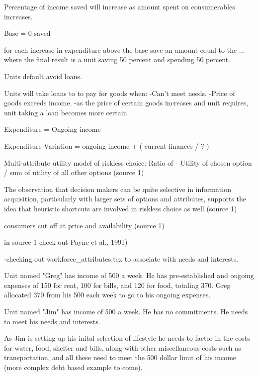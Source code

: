Percentage of income saved will increase as amount spent on consumerables increases.


Base = 0 saved

for each increase in expenditure above the base save an amount equal to the ... where the final result is a unit saving 50 percent and spending 50 percent.



Units default avoid loans.

Units will take loans to to pay for goods when:
-Can't meet needs.
-Price of goods exceeds income.
	-as the price of certain goods increases and unit requires, unit taking a loan becomes more certain. 





 

Expenditure = Ongoing income 

Expenditure Variation = ongoing income + ( current finances / ? )

Multi-attribute utility model of riskless choice:
Ratio of - Utility of chosen option / sum of utility of all other options (source 1)

The observation that decision makers can be quite selective in information acquisition, particularly with larger sets of options and attributes, supports the idea that heuristic shortcuts are involved in riskless choice as well (source 1)

consumers cut off at price and availability (source 1)

in source 1 check out Payne et al., 1991)


-checking out workforce_attributes.tex to associate with needs and interests.







Unit named "Greg" has income of 500 a week. He has pre-established and ongoing expenses of 150 for rent, 100 for bills, and 120 for food, totaling 370. Greg allocated 370 from his 500 each week to go to his ongoing expenses. 

Unit named "Jim" has income of 500 a week. He has no commitments. He needs to meet his needs and interests. 

As Jim is setting up his inital selection of lifestyle he needs to factor in the costs for water, food, shelter and bills, along with other miscellaneous costs such as transportation, and all these need to meet the 500 dollar limit of his income (more complex debt based example to come).

